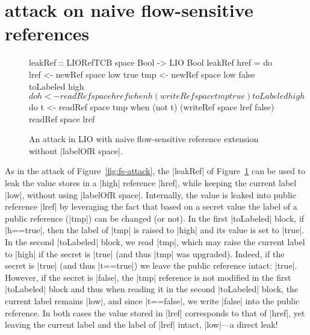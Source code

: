 \section{attack on naive flow-sensitive references}
\label{sec:app:fs-attack2}
\begin{figure}
\small
\begin{code}
leakRef :: LIORefTCB space Bool -> LIO Bool
leakRef href = do
  lref  <- newRef space low true
  tmp   <- newRef space low false
  toLabeled high $ do  h <- readRef space href
                       when h (writeRef space tmp true)
  toLabeled high $ do  t <- readRef space tmp
                       when (not t) (writeRef space lref false)
  readRef space lref
\end{code}
\caption{An attack in LIO with naive flow-sensitive reference
extension without |labelOfR space|.\label{fig:fs-attack2}}
\end{figure}
%
As in the attack of Figure~\ref{fig:fs-attack}, the |leakRef| of
Figure~\ref{fig:fs-attack2} can be used to leak the value stores in a |high|
reference |href|, while keeping the current label |low|, without using |labelOfR space|.
%
Internally, the value is leaked into public reference |lref| by leveraging the
fact that based on a secret value the label of a public reference (|tmp|) can
be changed (or not).
%
In the first |toLabeled| block, if |h==true|, then the label of |tmp| is raised
to |high| and its value is set to |true|.
%
In the second |toLabeled| block, we read |tmp|, which may raise the current
label to |high| if the secret is |true| (and thus |tmp| was upgraded).
%
Indeed, if the secret is |true| (and thus |t==true|) we leave the public
reference intact: |true|.
%
However, if the secret is |false|, the |tmp| reference is not modified in the
first |toLabeled| block and thus when reading it in the second |toLabeled|
block, the current label remains |low|, and since |t==false|, we write |false|
into the public reference.
%
In both cases the value stored in |lref| corresponds to that of |href|, yet
leaving the current label and the label of |lref| intact, |low|---a direct
leak!
